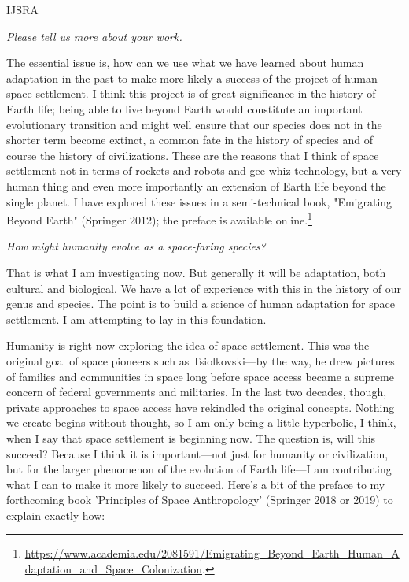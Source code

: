 \begin{labeling}{IJSRA}
	\item[IJSRA] \emph{Please tell us more about your work.}

	\item[CMS] The essential issue is, how can we use what we have learned about human adaptation in the past to make more likely a success of the project of human space settlement. I think this project is of great significance in the history of Earth life; being able to live beyond Earth would constitute an important evolutionary transition and might well ensure that our species does not in the shorter term become extinct, a common fate in the history of species and of course the history of civilizations. These are the reasons that I think of space settlement not in terms of rockets and robots and gee-whiz technology, but a very human thing and even more importantly an extension of Earth life beyond the single planet. I have explored these issues in a semi-technical book, "Emigrating Beyond Earth" (Springer 2012); the preface is available online.\footnote{\url{https://www.academia.edu/2081591/Emigrating_Beyond_Earth_Human_Adaptation_and_Space_Colonization}.}

	\item[IJSRA] \emph{How might humanity evolve as a space-faring species?}

	\item[CMS] That is what I am investigating now. But generally it will be adaptation, both cultural and biological. We have a lot of experience with this in the history of our genus and species. The point is to build a science of human adaptation for space settlement. I am attempting to lay in this foundation.

	Humanity is right now exploring the idea of space settlement. This was the original goal of space pioneers such as Tsiolkovski—by the way, he drew pictures of families and communities in space long before space access became a supreme concern of federal governments and militaries. In the last two decades, though, private approaches to space access have rekindled the original concepts. Nothing we create begins without thought, so I am only being a little hyperbolic, I think, when I say that space settlement is beginning now. The question is, will this succeed? Because I think it is important—not just for humanity or civilization, but for the larger phenomenon of the evolution of Earth life—I am contributing what I can to make it more likely to succeed. Here's a bit of the preface to my forthcoming book 'Principles of Space Anthropology' (Springer 2018 or 2019) to explain exactly how:


\end{labeling}
